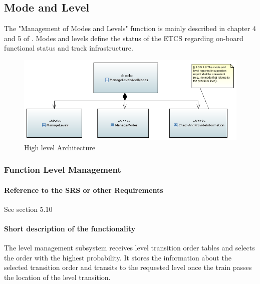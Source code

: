 \subsection{Mode and Level}


The "Management of Modes and Levels" function is mainly described in chapter 4 and 5 of \citep{subset-026}. Modes and levels define the status of the ETCS
regarding on-board functional status and track infrastructure.

\begin{figure}
\centering
\includegraphics[width=\textwidth]{images/FunctionalArchitecture.png}
\caption{High level Architecture}
\end{figure}

\subsubsection{Function Level Management}%

\paragraph{Reference to the SRS or other Requirements}
See \citep{subset-026} section 5.10

\paragraph{Short description of the functionality}
The level management subsystem receives level transition order tables and selects the order with the highest probability. It stores the information about the selected transition order and transits to the requested level once the train passes the location of the level transition.

